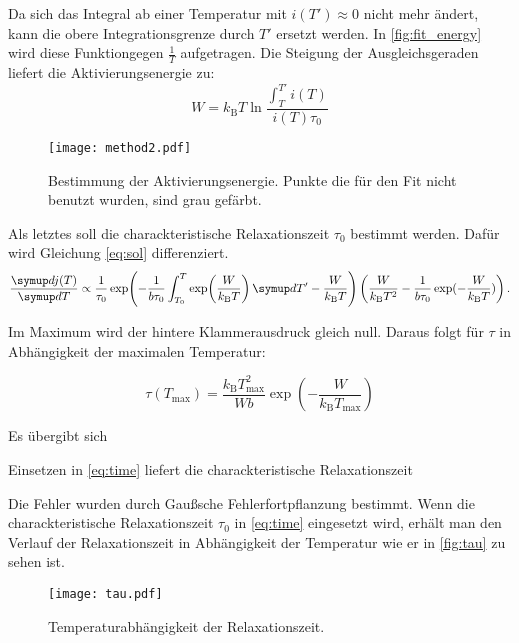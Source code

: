  Da sich das Integral ab einer Temperatur mit $i(T') \approx 0$ nicht mehr ändert,
kann die obere Integrationsgrenze durch $T'$ ersetzt werden.
In \autoref{fig:fit_energy} wird diese Funktiongegen $\frac{1}{T}$ aufgetragen.
Die Steigung der Ausgleichsgeraden liefert die Aktivierungsenergie zu:
\begin{equation}
  
\end{equation}
\begin{equation}
  W = k_\text{B} T \ln \frac{\int_T^{T'} i(T)}{ i(T) \tau_0}
  \label{eq:final}
\end{equation}


\begin{figure}
  \centering
  \texttt{[image: method2.pdf]}
  \caption{Bestimmung der Aktivierungsenergie. Punkte die für den Fit nicht benutzt wurden, sind grau gefärbt.}
  \label{fig:fit_energy}
\end{figure}


Als letztes soll die charackteristische Relaxationszeit $\tau_0$ bestimmt werden. Dafür wird Gleichung \eqref{eq:sol} differenziert.
\begin{equation}
  \label{eq:crazy}
  \dd{j(T)}{T} \propto
    \frac{1}{\tau_0}
    \exp\!\left(
      -\frac{1}{b\tau_0} \int_{T_0}^{T} \exp\! \left( \frac{W}{k_\text{B} T} \right)  \dif{T'} - \frac{W}{k_\text{B} T}
    \right) \left( \frac{W}{k_\text{B} T^2} -   \frac{1}{b\tau_0}\exp(-\frac{W}{k_\text{B} T}) \right).
\end{equation}

Im Maximum wird der hintere Klammerausdruck gleich null. Daraus folgt für $\tau$ in Abhängigkeit der maximalen Temperatur:

\begin{equation}
  \label{eq:tau}
  \tau(T_\text{max}) = \frac{k_\text{B} T_\text{max}^2}{W b} \exp\left(-\frac{W}{k_\text{B} T_\text{max}} \right)
\end{equation}

Es übergibt sich
\begin{equation}
  
\end{equation}

Einsetzen in \eqref{eq:time} liefert die  charackteristische Relaxationszeit
\begin{equation}
  
\end{equation}

Die Fehler wurden durch Gaußsche Fehlerfortpflanzung bestimmt.
Wenn die charackteristische Relaxationszeit $\tau_0$ in \eqref{eq:time} eingesetzt wird,
erhält man den Verlauf der  Relaxationszeit in Abhängigkeit der Temperatur wie er in \autoref{fig:tau} zu sehen ist.
\begin{figure}
  \centering
  \texttt{[image: tau.pdf]}
  \caption{Temperaturabhängigkeit der Relaxationszeit.}
  \label{fig:tau}
\end{figure}
